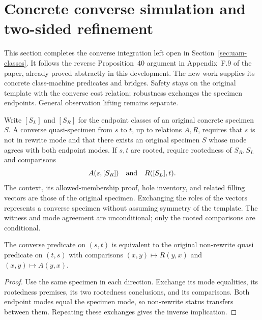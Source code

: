 \section{Concrete converse simulation and two-sided refinement}
\label{sec:class-converse}
This section completes the converse integration left open in
Section~\ref{sec:uam-classes}. It follows the reverse Proposition~40 argument
in Appendix~F.9 of the paper, already proved abstractly in this development.
The new work supplies its concrete class-machine predicates and bridges.
Safety stays on the original template with the converse cost relation;
robustness exchanges the specimen endpoints. General observation lifting
remains separate.

\begin{definition}
Write $[S_L]$ and $[S_R]$ for the endpoint classes of an original concrete specimen $S$. A converse quasi-specimen from $s$ to $t$, up to relations $A,R$, requires that $s$ is not in rewrite mode and that there exists an original specimen $S$ whose mode agrees with both endpoint modes. If $s,t$ are rooted, require rootedness of $S_R,S_L$ and comparisons
\[
 A(s,[S_R])\quad\hbox{and}\quad R([S_L],t).
\]
The context, its allowed-membership proof, hole inventory, and related filling vectors are those of the original specimen. Exchanging the roles of the vectors represents a converse specimen without assuming symmetry of the template. The witness and mode agreement are unconditional; only the rooted comparisons are conditional.
\end{definition}

\begin{lemma}
The converse predicate on $(s,t)$ is equivalent to the original non-rewrite quasi predicate on $(t,s)$ with comparisons $(x,y)\mapsto R(y,x)$ and $(x,y)\mapsto A(y,x)$.
\end{lemma}
\begin{proof}
Use the same specimen in each direction. Exchange its mode equalities, its rootedness premises, its two rootedness conclusions, and its comparisons. Both endpoint modes equal the specimen mode, so non-rewrite status transfers between them. Repeating these exchanges gives the inverse implication.
\end{proof}

